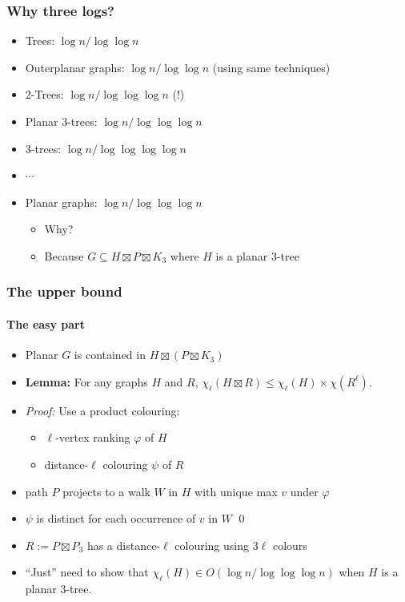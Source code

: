 \documentclass[xcolor=dvipsnames]{beamer}
\begin{document}
\begin{frame}
  \frametitle{Why three logs?}
  \begin{itemize}[<+->]
    \item Trees: $\log n/\log\log n$
    \item Outerplanar graphs: $\log n/\log\log n$ (using same techniques)
    \item $2$-Trees: $\log n/\log\log\log n$ \alert{(!)}
    \item Planar $3$-trees: $\log n/\log\log\log n$
    \item $3$-trees: $\log n/\log\log\log\log n$
    \item[]$\cdots$
    \item Planar graphs: $\log n/\log\log\log n$
    \begin{itemize}[<+->]
      \item Why?
      \item Because $G\subseteq H\boxtimes P\boxtimes K_3$ where $H$ is a planar 3-tree
    \end{itemize}
  \end{itemize}
\end{frame}


\begin{frame}
  \frametitle{The upper bound}
  \framesubtitle{The easy part}
  
  \begin{itemize}[<+->]
    \item Planar $G$ is contained in $H\boxtimes (P\boxtimes K_3)$
    \item \textbf{Lemma:} For any graphs $H$ and $R$, $\chi_\ell(H\boxtimes R) \le \chi_\ell(H)\times \chi(R^\ell)$.
    \item[] \textit{Proof:} Use a product colouring:
    \begin{itemize}
      \item $\ell$-vertex ranking $\varphi$ of $H$
      \item distance-$\ell$ colouring $\psi$ of $R$
    \end{itemize}
    \item[] path $P$ projects to a walk $W$ in $H$ with unique max $v$ under $\varphi$
    \item[] $\psi$ is distinct for each occurrence of $v$ in $W$ \hfill\qed
    
    \item $R:=P\boxtimes P_3$ has a distance-$\ell$ colouring using $3\ell$ colours
    \item ``Just'' need to show that $\chi_\ell(H)\in O(\log n/\log\log\log n)$ when $H$ is a planar $3$-tree.
  \end{itemize}
\end{frame}
\end{document}
